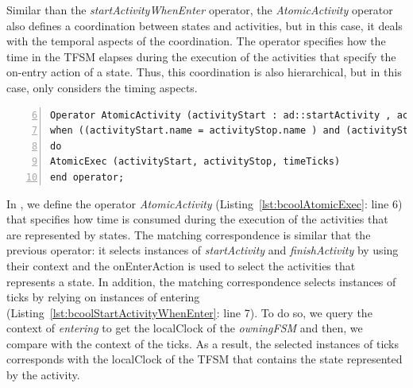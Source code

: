 Similar than the \emph{startActivityWhenEnter} operator, the \emph{AtomicActivity} operator also defines a coordination between states and activities, but in this case, it deals with the temporal aspects of the coordination. The operator specifies how the time in the TFSM elapses during the execution of the activities that specify the on-entry action of a state. Thus, this coordination is also hierarchical, but in this case, only considers the timing aspects. %

\begin{lstlisting}[language=bcool,
caption={Timing Hierarchical operator between TFSM and Activity languages},
label={lst:bcoolAtomicExec}, 
basicstyle=\scriptsize\ttfamily, backgroundcolor=\color{LGrey}, numbers=left, xleftmargin=2pt, firstnumber=6]
Operator AtomicActivity (activityStart : ad::startActivity , activityStop : ad::finishActivity, enterState : tfsm::entering, leaveState : tfsm::leaving, timeTicks : tfsm::ticks)
when ((activityStart.name = activityStop.name ) and (activityStart.name=enterState.OnEnterAction.name ) and (enterState.owningFSM.localClock = timeTicks));
do 
AtomicExec (activityStart, activityStop, timeTicks)
end operator;
\end{lstlisting}

In \bcool, we define the operator \emph{AtomicActivity} (Listing~\ref{lst:bcoolAtomicExec}: line 6) that specifies how time is consumed during the execution of the activities that are represented by states. The matching correspondence is similar that the previous operator: it selects instances of \dse \emph{startActivity} and \emph{finishActivity} by using their context and the onEnterAction is used to select the activities that represents a state. In addition, the matching correspondence selects instances of \dse ticks by relying on instances of \dse entering (Listing~\ref{lst:bcoolStartActivityWhenEnter}: line 7). To do so, we query the context of \dse \emph{entering} to get the localClock of the \emph{owningFSM} and then, we compare with the context of the \dse ticks. As a result, the selected instances of \dse ticks corresponds with the localClock of the TFSM that contains the state represented by the activity. 

